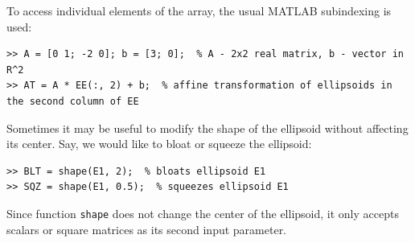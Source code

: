 \documentclass{report}
\begin{document}
To access individual elements of the array, the usual MATLAB subindexing
is used:
{\tt \begin{verbatim}
>> A = [0 1; -2 0]; b = [3; 0];  % A - 2x2 real matrix, b - vector in R^2
>> AT = A * EE(:, 2) + b;  % affine transformation of ellipsoids in the second column of EE
\end{verbatim} }
Sometimes it may be useful to modify the shape of the ellipsoid without
affecting its center. Say, we would like to bloat or squeeze the ellipsoid:
{\tt \begin{verbatim}
>> BLT = shape(E1, 2);  % bloats ellipsoid E1
>> SQZ = shape(E1, 0.5);  % squeezes ellipsoid E1
\end{verbatim} }
Since function {\tt shape} does not change the center of the ellipsoid,
it only accepts scalars or square matrices as its second input parameter.
\end{document}

